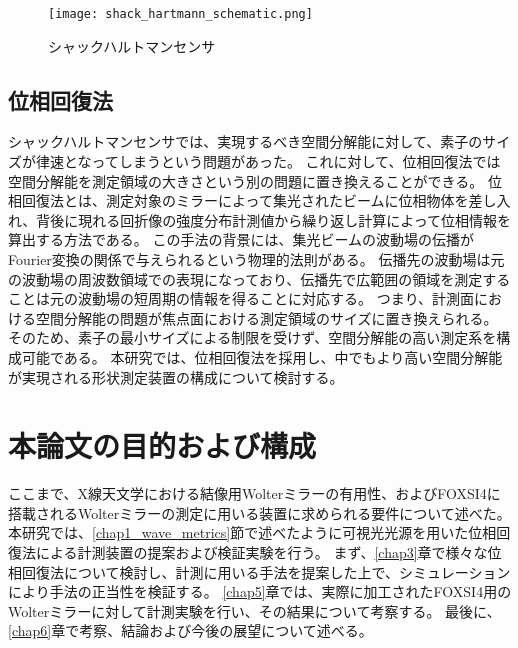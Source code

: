 \begin{figure}[h]
\centering
\texttt{[image: shack\_hartmann\_schematic.png]}
\caption{シャックハルトマンセンサ}
\label{fig:shack_hartmann_schematic}
\end{figure}

\subsection{位相回復法}
シャックハルトマンセンサでは、実現するべき空間分解能に対して、素子のサイズが律速となってしまうという問題があった。
これに対して、位相回復法では空間分解能を測定領域の大きさという別の問題に置き換えることができる。
位相回復法とは、測定対象のミラーによって集光されたビームに位相物体を差し入れ、背後に現れる回折像の強度分布計測値から繰り返し計算によって位相情報を算出する方法である。
この手法の背景には、集光ビームの波動場の伝播がFourier変換の関係で与えられるという物理的法則がある。
伝播先の波動場は元の波動場の周波数領域での表現になっており、伝播先で広範囲の領域を測定することは元の波動場の短周期の情報を得ることに対応する。
つまり、計測面における空間分解能の問題が焦点面における測定領域のサイズに置き換えられる。
そのため、素子の最小サイズによる制限を受けず、空間分解能の高い測定系を構成可能である。
本研究では、位相回復法を採用し、中でもより高い空間分解能が実現される形状測定装置の構成について検討する。

\clearpage
\newpage

\section{本論文の目的および構成}
\label{chap1_purpose}

ここまで、X線天文学における結像用Wolterミラーの有用性、およびFOXSI4に搭載されるWolterミラーの測定に用いる装置に求められる要件について述べた。
本研究では、\ref{chap1_wave_metrics}節で述べたように可視光光源を用いた位相回復法による計測装置の提案および検証実験を行う。
まず、\ref{chap3}章で様々な位相回復法について検討し、計測に用いる手法を提案した上で、シミュレーションにより手法の正当性を検証する。
\ref{chap5}章では、実際に加工されたFOXSI4用のWolterミラーに対して計測実験を行い、その結果について考察する。
最後に、\ref{chap6}章で考察、結論および今後の展望について述べる。

